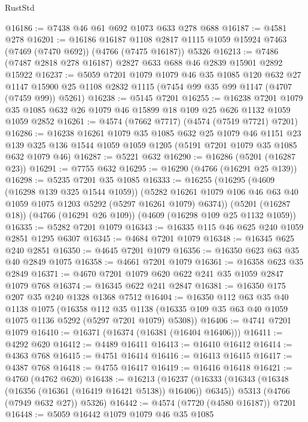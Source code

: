 \begin{lexlean}{RustStd}
\begin{coremodule}
{\begin{coremodule}
{{{{{{{{{{{{{{{{{{{{{{{{{{{{{{{{{{{@16186 := @7438 @46 @61 @692 @1073 @633 @278 @688
@16187 := @4581 @278
@16201 := @16186
    @16187
    @1108
    @2817
    @1115
    @1059
    @15924
    @7463
    (@7469 (@7470 @692))
    (@4766 (@7475 @16187))
    @5326
@16213 := @7486 (@7487 @2818 @278 @16187) @2827 @633 @688 @46 @2839 @15901 @2892 @15922
@16237 := @5059
    @7201
    @1079
    @1079
    @46
    @35
    @1085
    @120
    @632
    @27
    @1147
    @15900
    @25
    @1108
    @2832
    @1115
    (@7454 @99 @35 @99 @1147 (@4707 (@7459 @99)) @5261)
@16238 := @5145 @7201
@16255 := @16238
    @7201
    @1079
    @35
    @1085
    @632
    @26
    @1079
    @46
    @15899
    @18
    @109
    @25
    @626
    @1132
    @1059
    @1059
    @2852
@16261 := @4574 (@7662 @7717) (@4574 (@7519 @7721) @7201)
@16286 := @16238
    @16261
    @1079
    @35
    @1085
    @632
    @25
    @1079
    @46
    @1151
    @23
    @139
    @325
    @136
    @1544
    @1059
    @1059
    @1205
    (@5191 @7201 @1079 @35 @1085 @632 @1079 @46)
@16287 := @5221 @632
@16290 := @16286 (@5201 (@16287 @23))
@16291 := @7755 @632
@16295 := @16290 (@4766 (@16291 @25 @139))
@16298 := @5235 @7201 @35 @1085
@16333 := @16255
    (@16295
      (@4609 (@16298 @139 @325 @1544 @1059))
      (@5282 @16261 @1079 @106 @46 @63 @40 @1059 @1075 @1203 @5292 (@5297 @16261 @1079) @6374))
    (@5201 (@16287 @18))
    (@4766 (@16291 @26 @109))
    (@4609 (@16298 @109 @25 @1132 @1059))
@16335 := @5282 @7201 @1079
@16343 := @16335 @115 @46 @625 @240 @1059 @2851 @1295 @6307
@16345 := @4684 @7201 @1079
@16348 := @16345 @625 @240 @2851
@16350 := @4645 @7201 @1079
@16356 := @16350 @623 @63 @35 @40 @2849 @1075
@16358 := @4661 @7201 @1079
@16361 := @16358 @623 @35 @2849
@16371 := @4670 @7201 @1079 @620 @622 @241 @35 @1059 @2847 @1079 @768
@16374 := @16345 @622 @241 @2847
@16381 := @16350 @175 @207 @35 @240 @1328 @1368 @7512
@16404 := @16350
    @112
    @63
    @35
    @40
    @1138
    @1075
    (@16358
      @112
      @35
      @1138
      (@16335 @109 @35 @63 @40 @1059 @1075 @1136 @5292 (@5297 @7201 @1079) @5308))
@16406 := @4741 @7201 @1079
@16410 := @16371 (@16374 (@16381 (@16404 @16406)))
@16411 := @4292 @620
@16412 := @4489 @16411
@16413 := @16410 @16412
@16414 := @4363 @768
@16415 := @4751 @16414
@16416 := @16413 @16415
@16417 := @4387 @768
@16418 := @4755 @16417
@16419 := @16416 @16418
@16421 := @4760 (@4762 @620)
@16438 := @16213
    (@16237
      (@16333 (@16343 (@16348 (@16356 (@16361 (@16419 @16421 @5138)) @16406)) @6345))
      @5313
      (@4766 (@7949 @632 @27))
      @5326)
@16442 := @4574 (@7720 (@4580 @16187)) @7201
@16448 := @5059 @16442 @1079 @1079 @46 @35 @1085
}}}}}}}}}}}}}}}}}}}}}}}}}}}}}}}}}}}
\end{coremodule}}
\end{coremodule}
\end{lexlean}
